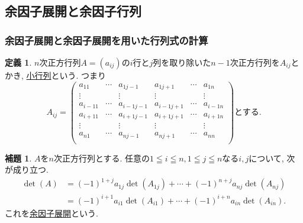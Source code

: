 \documentclass[dvipdfmx,a4paper,11pt]{article} %
\theoremstyle{definition}
\newtheorem{lem}[thm]{補題}
\newtheorem{dfn}[thm]{定義}
\begin{document}
\subsection{余因子展開と余因子行列 \cite[3.4節]{O}}

\subsubsection{余因子展開と余因子展開を用いた行列式の計算}
    \begin{dfn}
    $n$次正方行列$A=(a_{ij})$の$i$行と$j$列を取り除いた$n-1$次正方行列を$A_{ij}$とかき, \underline{小行列}という. 
    つまり
  $$
  A_{ij}
  =
    \begin{pmatrix}
a_{11}&   \cdots &a_{1j-1}&a_{1j+1}&\cdots&a_{1n} \\
\vdots&   		& \vdots &\vdots &   		&\vdots  \\
a_{i-11}&   \cdots &a_{i-1j-1}&a_{i-1j+1}&\cdots&a_{i-1n} \\
a_{i+11}&   \cdots &a_{i+1j-1}&a_{i+1j+1}&\cdots&a_{i+1n} \\
\vdots&   		& \vdots &\vdots &   		&\vdots  \\
a_{n1}&   \cdots &a_{nj-1}&a_{nj+1}&\cdots&a_{nn} \\
\end{pmatrix}
\text{とする.}
$$
    \end{dfn}




    \begin{lem}
 $A$を$n$次正方行列とする.
任意の$1 \leqq i \leqq n, 1 \leqq j\leqq n$なる$i,j$について, 次が成り立つ.
 \begin{align*}
 \det(A) & =(-1)^{1+j}a_{1j}\det(A_{1j}) + \cdots +(-1)^{n+j}a_{nj}\det(A_{nj}) 
 \\
 &=(-1)^{i+1}a_{i1}\det(A_{i1}) + \cdots +(-1)^{i+n}a_{in}\det(A_{in}).
  \end{align*}
  これを\underline{余因子展開}という.
\end{lem}
\end{document}
